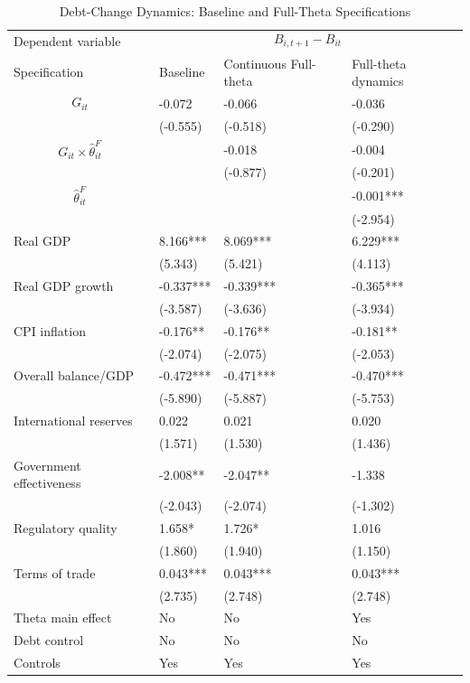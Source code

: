 \begin{table}[H]\centering
\begin{threeparttable}
\caption{Debt-Change Dynamics: Baseline and Full-Theta Specifications}
\label{tab:debt_change_combined_fulltheta}
\scriptsize
\begin{tabularx}{\textwidth}{lYYY}
\toprule
Dependent variable &  \\
\cmidrule(lr){2-4}
Specification & Baseline & Continuous Full-theta & Full-theta dynamics \\
\midrule
$$G_{it}$$ & -0.072 & -0.066 & -0.036 \\
 & (-0.555) & (-0.518) & (-0.290) \\
$$G_{it}\times\widehat{\theta}^{F}_{it}$$ &  & -0.018 & -0.004 \\
 &  & (-0.877) & (-0.201) \\
$$\widehat{\theta}^{F}_{it}$$ &  &  & -0.001*** \\
 &  &  & (-2.954) \\
Real GDP & 8.166*** & 8.069*** & 6.229*** \\
 & (5.343) & (5.421) & (4.113) \\
Real GDP growth & -0.337*** & -0.339*** & -0.365*** \\
 & (-3.587) & (-3.636) & (-3.934) \\
CPI inflation & -0.176** & -0.176** & -0.181** \\
 & (-2.074) & (-2.075) & (-2.053) \\
Overall balance/GDP & -0.472*** & -0.471*** & -0.470*** \\
 & (-5.890) & (-5.887) & (-5.753) \\
International reserves & 0.022 & 0.021 & 0.020 \\
 & (1.571) & (1.530) & (1.436) \\
Government effectiveness & -2.008** & -2.047** & -1.338 \\
 & (-2.043) & (-2.074) & (-1.302) \\
Regulatory quality & 1.658* & 1.726* & 1.016 \\
 & (1.860) & (1.940) & (1.150) \\
Terms of trade & 0.043*** & 0.043*** & 0.043*** \\
 & (2.735) & (2.748) & (2.748) \\
\midrule
Theta main effect & No & No & Yes \\
Debt control & No & No & No \\
Controls & Yes & Yes & Yes \\

\end{tabularx}
\end{threeparttable}
\end{table}
